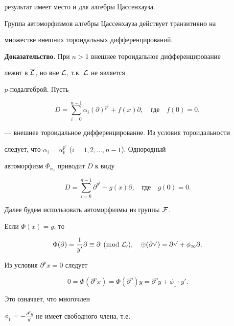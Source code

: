 результат имеет место и для алгебры Цассенхауза.





\begin{thm}


Группа автоморфизмов алгебры Цассенхауза действует транзитивно на


множестве внешних тороидальных дифференцирований.


\end{thm}





{\bf Доказательство.} При $n>1$ внешнее тороидальное дифференцирование


лежит в $\overline{\cal L}$, но вне $\cal L$, т.к. $\cal L$ не является


$p$-подалгеброй. Пусть


$$


D=\sum^{n-1}_{i=0}\alpha_i(\partial)^{p^i}+f(x)\partial,\quad


\text{где} \quad f(0)=0,


$$


--- внешнее тороидальное дифференцирование. Из условия тороидальности


следует, что $\alpha_i=\alpha_0^{p^i}$ ($i=1,2,\dotsc,n-1$). Однородный


автоморфизм $\Phi_{\alpha_0}$ приводит $D$ к виду


$$


D=\sum^{n-1}_{i=0}\partial^{p^i}+g(x)\partial,\quad


\text{где} \quad g(0)=0.


$$


Далее будем использовать автоморфизмы из группы $\cal F$.


Если $\Phi(x)=y$, то


$$


\Phi(\partial)=\frac{1}{y'}\partial\equiv\partial\pmod{\cal L_0},


\quad \Phi(\partial^p)=\partial^p+\phi_1\partial.


$$


Из условия $\partial^px=0$ следует


$$


0=\Phi(\partial^px)=\Phi(\partial^p)y=\partial^p y+\phi_1\cdot y'.


$$


Это означает, что многочлен


$\phi_1=-\frac{\partial^py}{y'}$ не имеет свободного члена, т.е.


